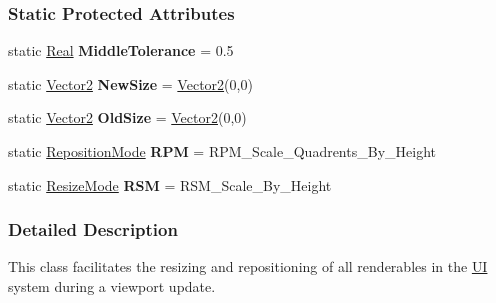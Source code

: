 \subsubsection*{Static Protected Attributes}
\begin{DoxyCompactItemize}
\item 
\hypertarget{classMezzanine_1_1UI_1_1ViewportUpdateTool_a856dddb9bb8ecbee6640689aedabc442}{
static \hyperlink{namespaceMezzanine_a726731b1a7df72bf3583e4a97282c6f6}{Real} {\bfseries MiddleTolerance} = 0.5}
\label{classMezzanine_1_1UI_1_1ViewportUpdateTool_a856dddb9bb8ecbee6640689aedabc442}

\item 
\hypertarget{classMezzanine_1_1UI_1_1ViewportUpdateTool_ac9345e92e931357c3c1807e220ad8bc2}{
static \hyperlink{classMezzanine_1_1Vector2}{Vector2} {\bfseries NewSize} = \hyperlink{classMezzanine_1_1Vector2}{Vector2}(0,0)}
\label{classMezzanine_1_1UI_1_1ViewportUpdateTool_ac9345e92e931357c3c1807e220ad8bc2}

\item 
\hypertarget{classMezzanine_1_1UI_1_1ViewportUpdateTool_a4b2ffdc983eefa548386fe9dbcea9f5b}{
static \hyperlink{classMezzanine_1_1Vector2}{Vector2} {\bfseries OldSize} = \hyperlink{classMezzanine_1_1Vector2}{Vector2}(0,0)}
\label{classMezzanine_1_1UI_1_1ViewportUpdateTool_a4b2ffdc983eefa548386fe9dbcea9f5b}

\item 
\hypertarget{classMezzanine_1_1UI_1_1ViewportUpdateTool_a72a54d9fa371049ff32f3aae4acc35ed}{
static \hyperlink{classMezzanine_1_1UI_1_1ViewportUpdateTool_ad2de82a6fc57859d914845ce676ff67e}{RepositionMode} {\bfseries RPM} = RPM\_\-Scale\_\-Quadrents\_\-By\_\-Height}
\label{classMezzanine_1_1UI_1_1ViewportUpdateTool_a72a54d9fa371049ff32f3aae4acc35ed}

\item 
\hypertarget{classMezzanine_1_1UI_1_1ViewportUpdateTool_a64dbf5c947c3567d7beab88fe9dc9835}{
static \hyperlink{classMezzanine_1_1UI_1_1ViewportUpdateTool_a89afdf79f52d5bf18bdffd323911a549}{ResizeMode} {\bfseries RSM} = RSM\_\-Scale\_\-By\_\-Height}
\label{classMezzanine_1_1UI_1_1ViewportUpdateTool_a64dbf5c947c3567d7beab88fe9dc9835}

\end{DoxyCompactItemize}


\subsubsection{Detailed Description}
This class facilitates the resizing and repositioning of all renderables in the \hyperlink{namespaceMezzanine_1_1UI}{UI} system during a viewport update. 

